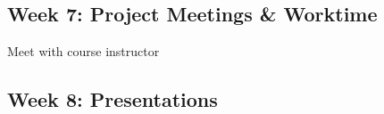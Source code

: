 \documentclass[11pt,]{article}
\begin{document}
\hypertarget{week-7-project-meetings-worktime}{%
\subsection{Week 7: Project Meetings \&
Worktime}\label{week-7-project-meetings-worktime}}

Meet with course instructor

\hypertarget{week-8-presentations}{%
\subsection{Week 8: Presentations}\label{week-8-presentations}}
\end{document}

